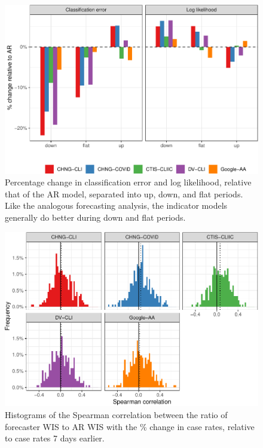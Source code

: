 \clearpage

\begin{figure}

{\centering \includegraphics[width=\textwidth]{fig/hotspots-upswing-downswing-1} 

}

\caption{Percentage change in classification error and log likelihood, relative that of the AR model, separated into up, down, and flat periods. Like the analogous forecasting analysis, the indicator models generally do better during down and flat periods.}\label{fig:hotspots-upswing-downswing}
\end{figure}

\begin{figure}

{\centering \includegraphics[width=\textwidth]{fig/cor-wis-ratio-1} 

}

\caption{Histograms of the Spearman correlation between the ratio of forecaster WIS to AR WIS with the \% change in case rates, relative to case rates 7 days earlier.}\label{fig:cor-wis-ratio}
\end{figure}

